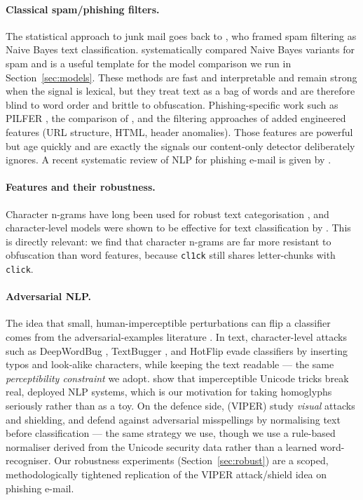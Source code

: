 \documentclass[11pt]{article}
\begin{document}
\paragraph{Classical spam/phishing filters.} The statistical approach to junk mail
goes back to \citet{sahami1998bayesian}, who framed spam filtering as Naive Bayes
text classification. \citet{metsis2006spam} systematically compared Naive Bayes
variants for spam and is a useful template for the model comparison we run in
Section~\ref{sec:models}. These methods are fast and interpretable and remain
strong when the signal is lexical, but they treat text as a bag of words and are
therefore blind to word order and brittle to obfuscation. Phishing-specific work
such as PILFER \citep{fette2007learning}, the comparison of
\citet{abunimeh2007comparison}, and the filtering approaches of
\citet{bergholz2010new} added engineered features (URL structure, HTML, header
anomalies). Those features are powerful but age quickly and are exactly the signals
our content-only detector deliberately ignores. A recent systematic review of NLP
for phishing e-mail is given by \citet{salloum2022systematic}.

\paragraph{Features and their robustness.} Character n-grams have long been used for
robust text categorisation \citep{cavnar1994ngram}, and character-level models were
shown to be effective for text classification by \citet{zhang2015character}. This is
directly relevant: we find that character n-grams are far more resistant to
obfuscation than word features, because \texttt{cl1ck} still shares letter-chunks
with \texttt{click}.

\paragraph{Adversarial NLP.} The idea that small, human-imperceptible perturbations
can flip a classifier comes from the adversarial-examples literature
\citep{goodfellow2015explaining}. In text, character-level attacks such as
DeepWordBug \citep{gao2018deepwordbug}, TextBugger \citep{li2019textbugger}, and
HotFlip \citep{ebrahimi2018hotflip} evade classifiers by inserting typos and
look-alike characters, while keeping the text readable --- the same
\emph{perceptibility constraint} we adopt. \citet{boucher2022bad} show that
imperceptible Unicode tricks break real, deployed NLP systems, which is our
motivation for taking homoglyphs seriously rather than as a toy. On the defence
side, \citet{eger2019viper} (VIPER) study \emph{visual} attacks and shielding, and
\citet{pruthi2019combating} defend against adversarial misspellings by normalising
text before classification --- the same strategy we use, though we use a rule-based
normaliser derived from the Unicode security data \citep{unicode2023tr39} rather
than a learned word-recogniser. Our robustness experiments (Section~\ref{sec:robust})
are a scoped, methodologically tightened replication of the VIPER attack/shield idea
on phishing e-mail.
\end{document}
